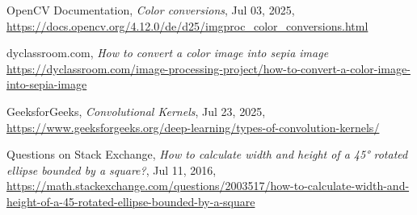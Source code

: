\begin{thebibliography}{9}

	OpenCV Documentation,
	\textit{Color conversions}, Jul 03, 2025,
	\newline
	\url{https://docs.opencv.org/4.12.0/de/d25/imgproc_color_conversions.html}

	dyclassroom.com,
	\textit{How to convert a color image into sepia image}
	\newline
	\url{https://dyclassroom.com/image-processing-project/how-to-convert-a-color-image-into-sepia-image}

	GeeksforGeeks,
	\textit{Convolutional Kernels}, Jul 23, 2025,
	\newline
	\url{https://www.geeksforgeeks.org/deep-learning/types-of-convolution-kernels/}


	Questions on Stack Exchange,
	\textit{How to calculate width and height of a 45° rotated ellipse bounded by a square?}, Jul 11, 2016,
	\newline
	\url{https://math.stackexchange.com/questions/2003517/how-to-calculate-width-and-height-of-a-45-rotated-ellipse-bounded-by-a-square}

\end{thebibliography}
